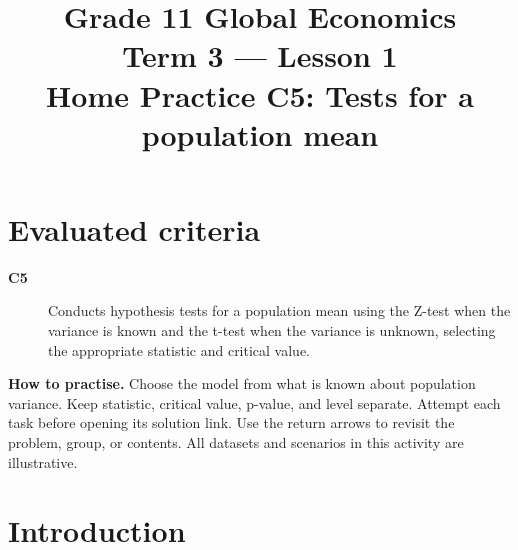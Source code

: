 \makeatletter
{}
\makeatother


\newcommand{\Pop}[1]{\HighlightStroke{GTenHLParameter}{#1}}
\newcommand{\Obs}[1]{\HighlightStroke{GTenHLValue}{#1}}
\newcommand{\Design}[1]{\HighlightStroke{GTenHLThird}{#1}}
\newcommand{\Result}[1]{\HighlightStroke{GTenHLOutcome}{#1}}

\title{Grade 11 Global Economics\\Term 3 --- Lesson 1\\Home Practice C5: Tests for a population mean}
\author{}\date{}

\maketitle
\setcounter{tocdepth}{1}
\setcounter{secnumdepth}{2}
\label{toc}
\tableofcontents
\section*{Evaluated criteria}
\begin{description}
\item[\textbf{C5}] Conducts hypothesis tests for a population mean using the Z-test when the variance is known and the t-test when the variance is unknown, selecting the appropriate statistic and critical value.
\end{description}
\textbf{How to practise.} Choose the model from what is known about population variance. Keep statistic, critical value, p-value, and level separate. Attempt each task before opening its solution link. Use the return arrows to revisit the problem, group, or contents. All datasets and scenarios in this activity are illustrative.
\clearpage
\section{Introduction}\label{sec:introduction}
